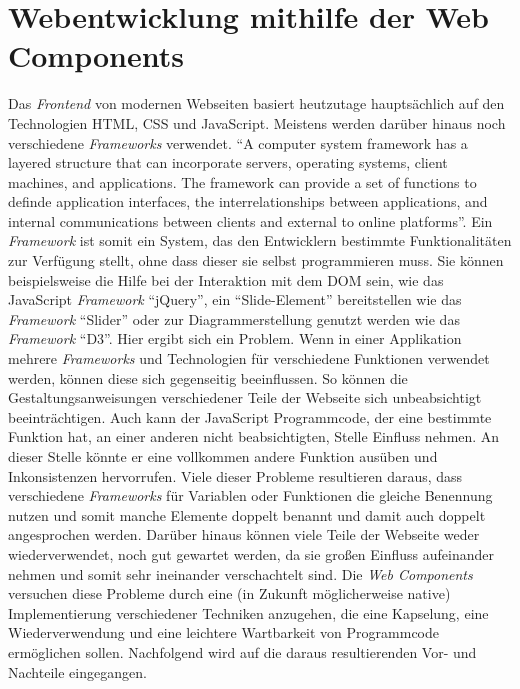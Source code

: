 \documentclass[12pt, paper=a4, bibtotoc, toc=listof, headsepline=true, numbers=endperiod]{scrreprt}
\begin{document}
		\section{Webentwicklung mithilfe der Web Components}
		Das \emph{Frontend} von modernen Webseiten basiert heutzutage hauptsächlich auf den Technologien \ac{HTML}, \ac{CSS} und JavaScript. Meistens werden darüber hinaus noch verschiedene \emph{Frameworks} verwendet. \enquote{A computer system framework has a layered structure that can incorporate servers, operating systems, client machines, and applications. The framework can provide a set of functions to definde application interfaces, the interrelationships between applications, and internal communications between clients and external to online platforms}\cite[S.15]{stuart2013roadmap}. Ein \emph{Framework} ist somit ein System, das den Entwicklern bestimmte Funktionalitäten zur Verfügung stellt, ohne dass dieser sie selbst programmieren muss. Sie können beispielsweise die Hilfe bei der Interaktion mit dem \ac{DOM} sein, wie das JavaScript \emph{Framework} \enquote{jQuery}, ein \enquote{Slide-Element} bereitstellen wie das \emph{Framework} \enquote{Slider} oder zur Diagrammerstellung genutzt werden wie das \emph{Framework} \enquote{D3}. Hier ergibt sich ein Problem. Wenn in einer Applikation mehrere \emph{Frameworks} und Technologien für verschiedene Funktionen verwendet werden, können diese sich gegenseitig beeinflussen. So können die Gestaltungsanweisungen verschiedener Teile der Webseite sich unbeabsichtigt beeinträchtigen. Auch kann der  JavaScript Programmcode, der eine bestimmte Funktion hat, an einer anderen nicht beabsichtigten, Stelle Einfluss nehmen. An dieser Stelle könnte er eine vollkommen andere Funktion ausüben und Inkonsistenzen hervorrufen. Viele dieser Probleme resultieren daraus, dass verschiedene \emph{Frameworks} für Variablen oder Funktionen die gleiche Benennung nutzen und somit manche Elemente doppelt benannt und damit auch doppelt angesprochen werden. Darüber hinaus können viele Teile der Webseite weder wiederverwendet, noch gut gewartet werden, da sie großen Einfluss aufeinander nehmen und somit sehr ineinander verschachtelt sind.
		Die \emph{Web Components} versuchen diese Probleme durch eine (in Zukunft möglicherweise native) Implementierung verschiedener Techniken anzugehen, die eine Kapselung, eine Wiederverwendung und eine leichtere Wartbarkeit von Programmcode ermöglichen sollen. Nachfolgend wird auf die daraus resultierenden Vor- und Nachteile eingegangen. 			
\end{document}

